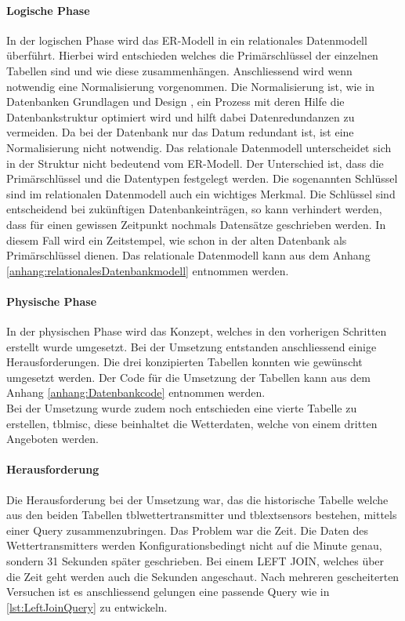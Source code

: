 \paragraph{Logische Phase}

In der logischen Phase wird das ER-Modell in ein relationales Datenmodell überführt.
Hierbei wird entschieden welches die Primärschlüssel der einzelnen Tabellen sind und wie diese zusammenhängen. Anschliessend wird wenn notwendig eine Normalisierung vorgenommen. Die Normalisierung ist, wie in Datenbanken Grundlagen und Design \cite{FrankGeisler2011mitpu}, ein Prozess mit deren Hilfe die Datenbankstruktur optimiert wird und hilft dabei Datenredundanzen zu vermeiden. Da bei der Datenbank nur das Datum redundant ist, ist eine Normalisierung nicht notwendig. Das relationale Datenmodell unterscheidet sich in der Struktur nicht bedeutend vom ER-Modell. Der Unterschied  ist, dass die Primärschlüssel und die Datentypen festgelegt werden. Die sogenannten Schlüssel sind im relationalen Datenmodell auch ein wichtiges Merkmal. Die Schlüssel sind entscheidend bei zukünftigen Datenbankeinträgen, so kann verhindert werden, dass für einen gewissen Zeitpunkt nochmals Datensätze geschrieben werden. In diesem Fall wird ein Zeitstempel, wie schon in der alten Datenbank als Primärschlüssel dienen. Das relationale Datenmodell kann aus dem Anhang \ref{anhang:relationalesDatenbankmodell} entnommen werden.

\paragraph{Physische Phase}

In der physischen Phase wird das Konzept, welches in den vorherigen Schritten erstellt wurde umgesetzt. Bei der Umsetzung entstanden anschliessend einige Herausforderungen. Die drei konzipierten Tabellen konnten wie gewünscht umgesetzt werden. Der Code für die Umsetzung der Tabellen kann aus dem Anhang \ref{anhang:Datenbankcode} entnommen werden.\\
Bei der Umsetzung wurde zudem noch entschieden eine vierte Tabelle zu erstellen, tblmisc, diese beinhaltet die Wetterdaten, welche von einem dritten Angeboten werden.

\paragraph{Herausforderung}
Die Herausforderung bei der Umsetzung war, das die historische Tabelle welche aus den beiden Tabellen tblwettertransmitter und tblextsensors bestehen, mittels einer Query zusammenzubringen. Das Problem war die Zeit. Die Daten des Wettertransmitters werden Konfigurationsbedingt nicht auf die Minute genau, sondern 31 Sekunden später geschrieben. Bei einem LEFT JOIN, welches über die Zeit geht werden auch die Sekunden angeschaut. Nach mehreren gescheiterten Versuchen ist es anschliessend gelungen eine passende Query wie in \ref{lst:LeftJoinQuery} zu entwickeln. 

